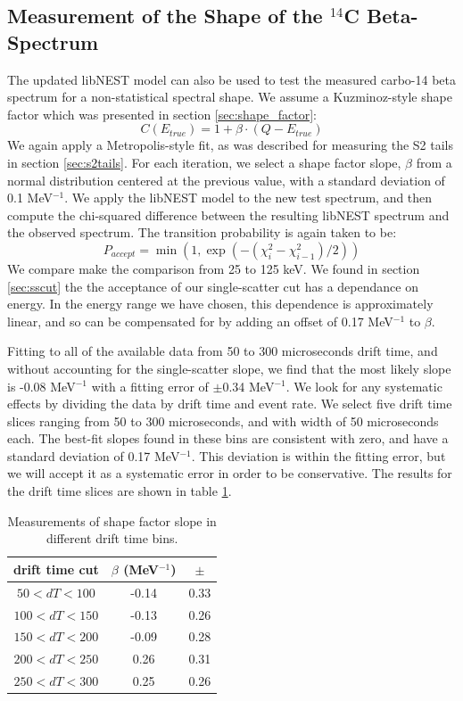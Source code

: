 \subsection{Measurement of the Shape of the $^{14}$C Beta-Spectrum}
The updated libNEST model can also be used to test the measured carbo-14 beta spectrum for a non-statistical spectral shape. We assume a Kuzminoz-style shape factor\cite{C14_kuzminov} which was presented in section \ref{sec:shape_factor}:
\begin{equation}
C(E_{true})=1+\beta\cdot(Q-E_{true})
\end{equation}
We again apply a Metropolis-style fit, as was described for measuring the S2 tails in section \ref{sec:s2tails}. For each iteration, we select a shape factor slope, $\beta$ from a normal distribution centered at the previous value, with a standard deviation of 0.1 MeV$^{-1}$. We apply the libNEST model to the new test spectrum, and then compute the chi-squared difference between the resulting libNEST spectrum and the observed spectrum. The transition probability is again taken to be:
\begin{equation}
P_{accept}=\min(1,\exp(-(\chi_i^2-\chi_{i-1}^2)/2))
\end{equation}
We compare make the comparison from 25 to 125 keV. We found in section \ref{sec:sscut} the the acceptance of our single-scatter cut has a dependance on energy. In the energy range we have chosen, this dependence is approximately linear, and so can be compensated for by adding an offset of 0.17 MeV$^{-1}$ to $\beta$.

Fitting to all of the available data from 50 to 300 microseconds drift time, and without accounting for the single-scatter slope, we find that the most likely slope is -0.08 MeV$^{-1}$ with a fitting error of $\pm$0.34 MeV$^{-1}$. We look for any systematic effects by dividing the data by drift time and event rate. We select five drift time slices ranging from 50 to 300 microseconds, and with width of 50 microseconds each. The best-fit slopes found in these bins are consistent with zero, and have a standard deviation of 0.17 MeV$^{-1}$. This deviation is within the fitting error, but we will accept it as a systematic error in order to be conservative. The results for the drift time slices are shown in table \ref{tab:shape_dt}. 
\begin{table}
\centering
\begin{tabular}{c | c | c}
\hline
drift time cut & $\beta$ (MeV$^{-1}$) & $\pm$\\
\hline\hline
$50<dT<100$ & -0.14 & 0.33\\
$100<dT<150$ & -0.13 & 0.26\\
$150<dT<200$ & -0.09 & 0.28\\
$200<dT<250$ & 0.26 & 0.31\\
$250<dT<300$ & 0.25 & 0.26\\
\hline
\end{tabular}
\caption{Measurements of shape factor slope in different drift time bins.}
\label{tab:shape_dt}
\end{table}


